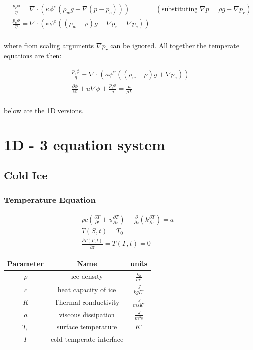 \documentclass[a4paper,12pt]{article}
\newcommand{\pd}[2]{\frac{\partial #1}{\partial #2}}
\begin{document}
\begin{align*}
  &\frac{p_e\phi}{\eta} = \nabla \cdot (\kappa\phi^\alpha(\rho_w g - \nabla (p - p_e))) & (\text{substituting } \nabla p = \rho g + \nabla p_r)\\
  &\frac{p_e\phi}{\eta} = \nabla \cdot (\kappa\phi^\alpha((\rho_w - \rho) g + \nabla p_r + \nabla p_e))\\
\end{align*}

where from scaling arguments $\nabla p_r$ can be ignored. All together the temperate equations are then:

\begin{align*}
  &\frac{p_e\phi}{\eta} = \nabla \cdot (\kappa\phi^\alpha((\rho_w - \rho) g + \nabla p_e))\\
  &\pd{\phi}{t} + u \nabla \phi + \frac{p_e\phi}{\eta} = \frac{a}{\rho L} \\
\end{align*}

below are the 1D versions.

\section{1D - 3 equation system}

\subsection{Cold Ice}

\subsubsection{Temperature Equation}
\begin{align*}
  \rho c \left(\pd{T}{t} + u \pd{T}{z}\right) - \pd{}z\left(k \pd{T}{z}\right) = a \\
  T(S,t) = T_0\\
  \pd{T(\Gamma,t)}{z} = T(\Gamma,t) = 0
\end{align*}

\begin{center}
\begin{tabular}{ |c|c|c| } 
 \hline
  Parameter & Name & units\\
  \hline
  $\rho$ & ice density & $\frac{kg}{m^3}$\\
  \hline
  $c$ & heat capacity of ice & $\frac{J}{kg K^\circ}$\\
  \hline
  $K$ & Thermal conductivity & $\frac{J}{ ms K^\circ}$\\
  \hline
  $a$ & viscous dissipation & $\frac{J}{m^3 s}$\\
  \hline
  $T_0$ & surface temperature & $K^\circ$\\
  \hline
  $\Gamma$ & cold-temperate interface & \\
  \hline
\end{tabular}
\end{center}
\end{document}
